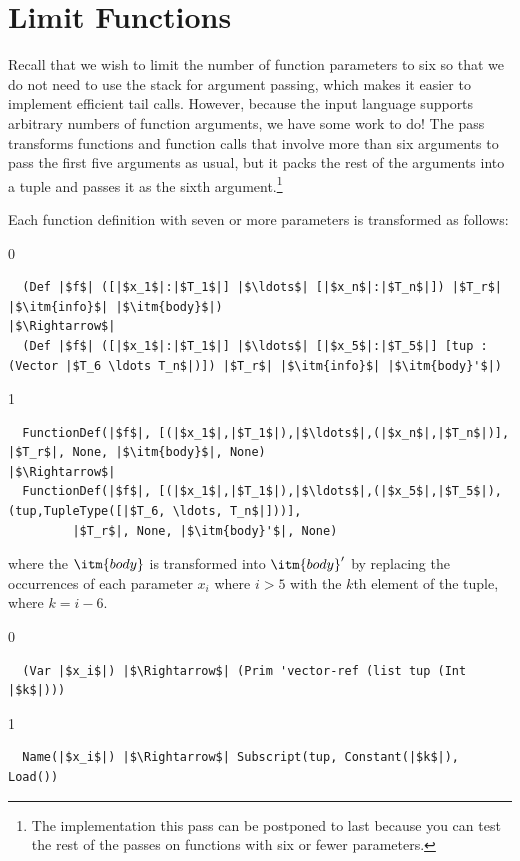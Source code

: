 \documentclass[7x10]{TimesAPriori_MIT}%
\def\racketEd{0}
\def\pythonEd{1}
\def\edition{1}
\newcommand{\pythonColor}[0]{}
\numberwithin{theorem}{chapter}
\numberwithin{definition}{chapter}
\numberwithin{equation}{chapter}
\begin{document}
\section{Limit Functions}
\label{sec:limit-functions-r4}

Recall that we wish to limit the number of function parameters to six
so that we do not need to use the stack for argument passing, which
makes it easier to implement efficient tail calls.  However, because
the input language \LangFun{} supports arbitrary numbers of function
arguments, we have some work to do! The  pass
transforms functions and function calls that involve more than six
arguments to pass the first five arguments as usual, but it packs the
rest of the arguments into a tuple and passes it as the sixth
argument.\footnote{The implementation this pass can be postponed to
  last because you can test the rest of the passes on functions with
  six or fewer parameters.}

Each function definition with seven or more parameters is transformed as
follows:
{\if\edition\racketEd   
\begin{lstlisting}
  (Def |$f$| ([|$x_1$|:|$T_1$|] |$\ldots$| [|$x_n$|:|$T_n$|]) |$T_r$| |$\itm{info}$| |$\itm{body}$|) 
|$\Rightarrow$|
  (Def |$f$| ([|$x_1$|:|$T_1$|] |$\ldots$| [|$x_5$|:|$T_5$|] [tup : (Vector |$T_6 \ldots T_n$|)]) |$T_r$| |$\itm{info}$| |$\itm{body}'$|) 
\end{lstlisting}
\fi}
{\if\edition\pythonEd\pythonColor   
\begin{lstlisting}
  FunctionDef(|$f$|, [(|$x_1$|,|$T_1$|),|$\ldots$|,(|$x_n$|,|$T_n$|)], |$T_r$|, None, |$\itm{body}$|, None)
|$\Rightarrow$|
  FunctionDef(|$f$|, [(|$x_1$|,|$T_1$|),|$\ldots$|,(|$x_5$|,|$T_5$|),(tup,TupleType([|$T_6, \ldots, T_n$|]))],
         |$T_r$|, None, |$\itm{body}'$|, None)
\end{lstlisting}
\fi}
%
\noindent where the $\itm{body}$ is transformed into $\itm{body}'$ by
replacing the occurrences of each parameter $x_i$ where $i > 5$ with
the $k$th element of the tuple, where $k = i - 6$.
%
{\if\edition\racketEd
\begin{lstlisting}
  (Var |$x_i$|) |$\Rightarrow$| (Prim 'vector-ref (list tup (Int |$k$|)))
\end{lstlisting}
\fi}
{\if\edition\pythonEd\pythonColor   
\begin{lstlisting}
  Name(|$x_i$|) |$\Rightarrow$| Subscript(tup, Constant(|$k$|), Load())
\end{lstlisting}
\fi}
\end{document}
